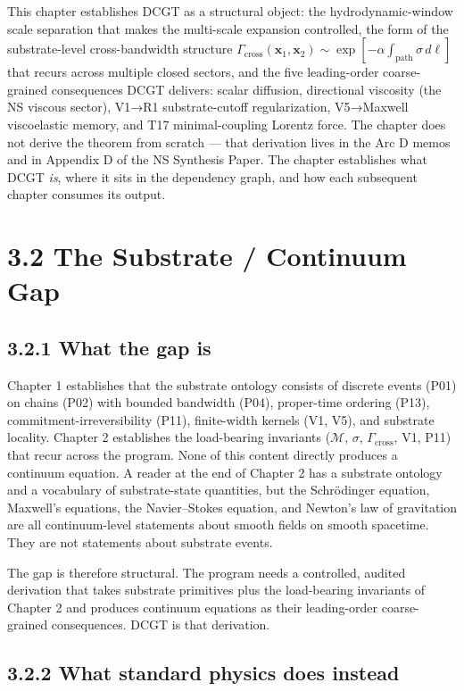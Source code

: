 \documentclass[11pt]{book}
\begin{document}
This chapter establishes DCGT as a structural object: the hydrodynamic-window scale separation that makes the multi-scale expansion controlled, the form of the substrate-level cross-bandwidth structure $\Gamma_\mathrm{cross}(\mathbf{x}_1,\mathbf{x}_2) \sim \exp[-\alpha\int_\mathrm{path}\sigma\,d\ell]$ that recurs across multiple closed sectors, and the five leading-order coarse-grained consequences DCGT delivers: scalar diffusion, directional viscosity (the NS viscous sector), V1→R1 substrate-cutoff regularization, V5→Maxwell viscoelastic memory, and T17 minimal-coupling Lorentz force. The chapter does not derive the theorem from scratch — that derivation lives in the Arc D memos and in Appendix D of the NS Synthesis Paper. The chapter establishes what DCGT \textit{is}, where it sits in the dependency graph, and how each subsequent chapter consumes its output.

\section{3.2 The Substrate / Continuum Gap}

\subsection{3.2.1 What the gap is}

Chapter 1 establishes that the substrate ontology consists of discrete events (P01) on chains (P02) with bounded bandwidth (P04), proper-time ordering (P13), commitment-irreversibility (P11), finite-width kernels (V1, V5), and substrate locality. Chapter 2 establishes the load-bearing invariants ($\mathcal{M}$, $\sigma$, $\Gamma_\mathrm{cross}$, V1, P11) that recur across the program. None of this content directly produces a continuum equation. A reader at the end of Chapter 2 has a substrate ontology and a vocabulary of substrate-state quantities, but the Schrödinger equation, Maxwell's equations, the Navier–Stokes equation, and Newton's law of gravitation are all continuum-level statements about smooth fields on smooth spacetime. They are not statements about substrate events.

The gap is therefore structural. The program needs a controlled, audited derivation that takes substrate primitives plus the load-bearing invariants of Chapter 2 and produces continuum equations as their leading-order coarse-grained consequences. DCGT is that derivation.

\subsection{3.2.2 What standard physics does instead}
\end{document}
